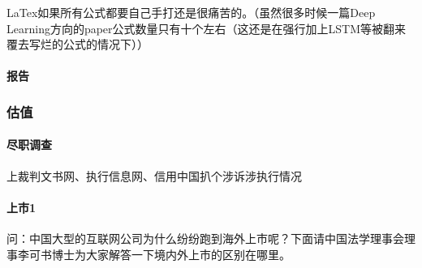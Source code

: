 \documentclass[letterpaper,11pt,english]{sphinxmanual}
\begin{document}
LaTex如果所有公式都要自己手打还是很痛苦的。（虽然很多时候一篇Deep
Learning方向的paper公式数量只有十个左右（这还是在强行加上LSTM等被翻来覆去写烂的公式的情况下））



\paragraph{报告}
\label{\detokenize{chapter_knowledge/research:id11}}


\subsubsection{估值}
\label{\detokenize{chapter_knowledge/Valuation:id1}}\label{\detokenize{chapter_knowledge/Valuation::doc}}

\paragraph{尽职调查}
\label{\detokenize{chapter_knowledge/Valuation:id2}}
上裁判文书网、执行信息网、信用中国扒个涉诉涉执行情况


\paragraph{上市1\sphinxfootnotemark[593]}
\label{\detokenize{chapter_knowledge/Valuation:id3}}%
\begin{footnotetext}[593]\sphinxAtStartFootnote
{}
%
\end{footnotetext}\ignorespaces 
问：中国大型的互联网公司为什么纷纷跑到海外上市呢？下面请中国法学理事会理事李可书博士为大家解答一下境内外上市的区别在哪里。
\end{document}
